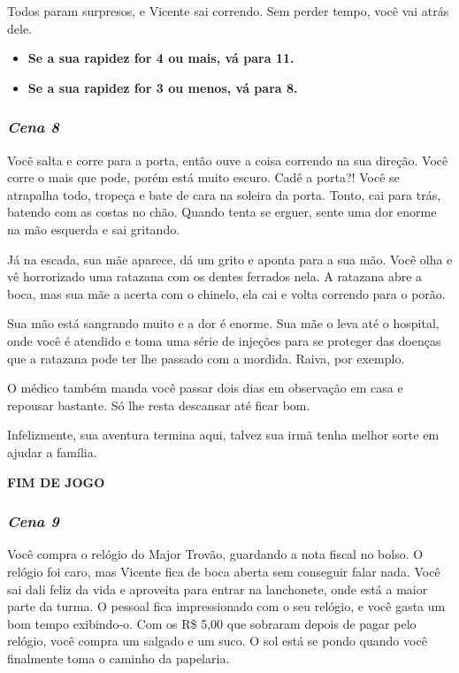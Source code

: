 Todos param surpresos, e Vicente sai correndo. Sem perder tempo, você vai atrás dele.

\begin{itemize}
	\item \textbf{Se a sua rapidez for 4 ou mais, vá para 11.}
	\item \textbf{Se a sua rapidez for 3 ou menos, vá para 8.}
\end{itemize}

\bigskip\medskip

\subsubsection*{\textit{\textbf{Cena 8}}}
Você salta e corre para a porta, então ouve a coisa correndo na sua direção. Você corre o mais que pode, porém está muito escuro. Cadê a porta?! Você se atrapalha todo, tropeça e bate de cara na soleira da porta. Tonto, cai para trás, batendo com as costas no chão.
Quando tenta se erguer, sente uma dor enorme na mão esquerda e sai gritando.

Já na escada, sua mãe aparece, dá um grito e aponta para a sua mão. Você olha e vê horrorizado uma ratazana com os dentes ferrados nela. A ratazana abre a boca, mas sua mãe a acerta com o chinelo, ela cai e volta correndo para o porão.

Sua mão está sangrando muito e a dor é enorme. Sua mãe o leva até o hospital, onde você é atendido e toma uma série de injeções para se proteger das doenças que a ratazana pode ter lhe passado com a mordida. Raiva, por exemplo.

O médico também manda você passar dois dias em observação em casa e repousar bastante. Só lhe resta descansar até ficar bom.

Infelizmente, sua aventura termina aqui, talvez sua irmã tenha melhor sorte em ajudar a família.

\textbf{FIM DE JOGO}

\bigskip\medskip

\subsubsection*{\textit{\textbf{Cena 9}}}

Você compra o relógio do Major Trovão, guardando a nota fiscal no bolso. O relógio foi caro, mas Vicente fica de boca aberta sem conseguir falar nada. Você sai dali feliz da vida e aproveita para entrar na lanchonete, onde está a maior parte da turma. O pessoal fica impressionado com o seu relógio, e você gasta um bom tempo exibindo-o. Com os R\$ 5,00 que sobraram depois de pagar pelo relógio, você compra um salgado e um suco. O sol está se pondo quando você finalmente toma o caminho da papelaria.

